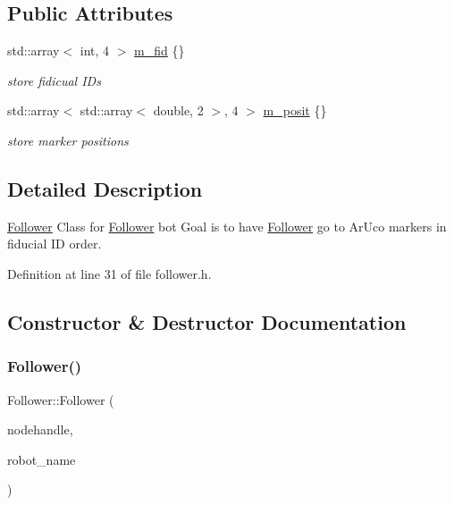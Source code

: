 \subsection*{Public Attributes}
\begin{DoxyCompactItemize}
\item 
std\+::array$<$ int, 4 $>$ \hyperlink{class_follower_a350054bbd7659d493cccc4b4ad9bc460}{m\+\_\+fid} \{\}
\begin{DoxyCompactList}\small\item\em store fidicual I\+Ds \end{DoxyCompactList}\item 
std\+::array$<$ std\+::array$<$ double, 2 $>$, 4 $>$ \hyperlink{class_follower_a6d4e1ebbe79cc8af601d53cba7aeb30a}{m\+\_\+posit} \{\}
\begin{DoxyCompactList}\small\item\em store marker positions \end{DoxyCompactList}\end{DoxyCompactItemize}


\subsection{Detailed Description}
\hyperlink{class_follower}{Follower} Class for \hyperlink{class_follower}{Follower} bot Goal is to have \hyperlink{class_follower}{Follower} go to Ar\+Uco markers in fiducial ID order. 

Definition at line 31 of file follower.\+h.



\subsection{Constructor \& Destructor Documentation}
\mbox{\label{class_follower_a6870e654b7cc901944ead12870a6b107}} 
\subsubsection{\texorpdfstring{Follower()}{Follower()}}
{\footnotesize\ttfamily Follower\+::\+Follower (\begin{DoxyParamCaption}\item[{ros\+::\+Node\+Handle $\ast$}]{nodehandle,  }\item[{const std\+::string \&}]{robot\+\_\+name }\end{DoxyParamCaption})}



